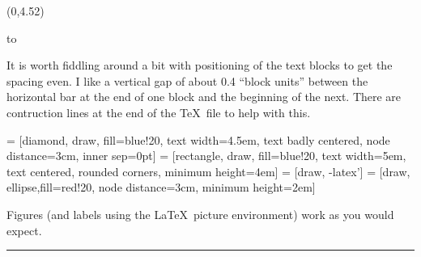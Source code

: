\documentclass[a0]{a0poster}
\def\Head#1{\noindent\hbox to \hsize{\hfil{\LARGE\color{DarkBlue}\sf #1}}\bigskip}
\begin{document}
\begin{textblock}{7}(0,4.52)

\Head{First Piece of Content}

\sf 
It is worth fiddling around a bit with positioning of the text blocks to get the spacing even. I like a vertical gap of about 0.4 ``block units'' between the horizontal bar at the end of one block and the beginning of the next. There are contruction lines at the end of the \TeX\ file to help with this.



 = [diamond, draw, fill=blue!20, 
    text width=4.5em, text badly centered, node distance=3cm, inner sep=0pt]
 = [rectangle, draw, fill=blue!20, 
    text width=5em, text centered, rounded corners, minimum height=4em]
 = [draw, -latex']
 = [draw, ellipse,fill=red!20, node distance=3cm,
    minimum height=2em]
    


Figures (and labels using the \LaTeX\ picture environment) work as you would expect. 

\bigskip
\hrule
\end{textblock}
\end{document}
